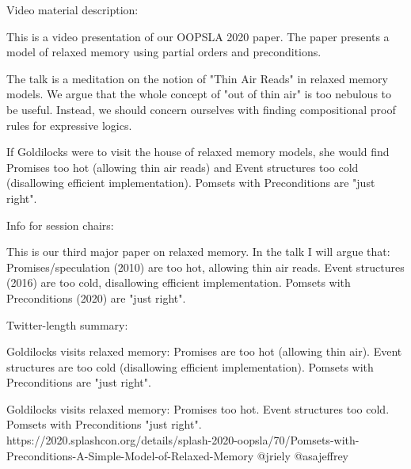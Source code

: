 Video material description:

This is a video presentation of our OOPSLA 2020 paper.  The paper presents a
model of relaxed memory using partial orders and preconditions.

The talk is a meditation on the notion of "Thin Air Reads" in relaxed memory
models.  We argue that the whole concept of "out of thin air" is too nebulous
to be useful.  Instead, we should concern ourselves with finding
compositional proof rules for expressive logics.

If Goldilocks were to visit the house of relaxed memory models, she would
find Promises too hot (allowing thin air reads) and Event structures too cold
(disallowing efficient implementation).  Pomsets with Preconditions are "just
right".





Info for session chairs:

This is our third major paper on relaxed memory.  In the talk I will argue
that: Promises/speculation (2010) are too hot, allowing thin air reads.
Event structures (2016) are too cold, disallowing efficient implementation.
Pomsets with Preconditions (2020) are "just right".




Twitter-length summary:

Goldilocks visits relaxed memory: Promises are too hot (allowing thin air).
Event structures are too cold (disallowing efficient implementation).
Pomsets with Preconditions are "just right".

Goldilocks visits relaxed memory: Promises too hot. Event structures too cold. Pomsets with Preconditions "just right".
https://2020.splashcon.org/details/splash-2020-oopsla/70/Pomsets-with-Preconditions-A-Simple-Model-of-Relaxed-Memory
@jriely @asajeffrey
